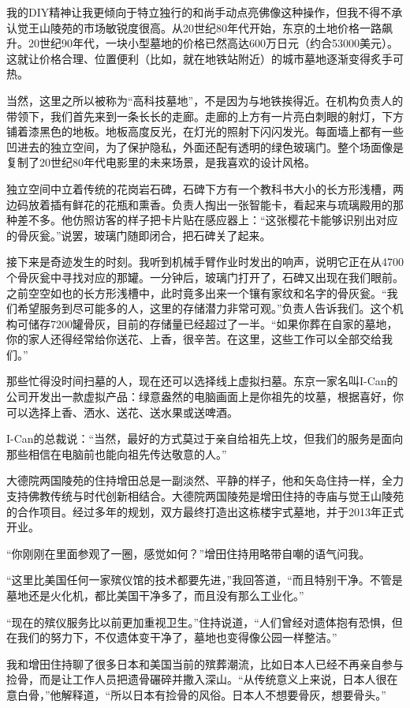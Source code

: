 \documentclass[12pt,oneside]{book}
\begin{document}
\begin{bookref}[frametitle={\cite{好好告别：世界葬礼观察手记}}]
我的DIY精神让我更倾向于特立独行的和尚手动点亮佛像这种操作，但我不得不承认觉王山陵苑的市场敏锐度很高。从20世纪80年代开始，东京的土地价格一路飙升。20世纪90年代，一块小型墓地的价格已然高达600万日元（约合53000美元）。这就让价格合理、位置便利（比如，就在地铁站附近）的城市墓地逐渐变得炙手可热。

当然，这里之所以被称为“高科技墓地”，不是因为与地铁挨得近。在机构负责人的带领下，我们首先来到一条长长的走廊。走廊的上方有一片亮白刺眼的射灯，下方铺着漆黑色的地板。地板高度反光，在灯光的照射下闪闪发光。每面墙上都有一些凹进去的独立空间，为了保护隐私，外面还配有透明的绿色玻璃门。整个场面像是复制了20世纪80年代电影里的未来场景，是我喜欢的设计风格。

独立空间中立着传统的花岗岩石碑，石碑下方有一个教科书大小的长方形浅槽，两边码放着插有鲜花的花瓶和熏香。负责人掏出一张智能卡，看起来与琉璃殿用的那种差不多。他仿照访客的样子把卡片贴在感应器上：“这张樱花卡能够识别出对应的骨灰瓮。”说罢，玻璃门随即闭合，把石碑关了起来。

接下来是奇迹发生的时刻。我听到机械手臂作业时发出的响声，说明它正在从4700个骨灰瓮中寻找对应的那罐。一分钟后，玻璃门打开了，石碑又出现在我们眼前。之前空空如也的长方形浅槽中，此时竟多出来一个镶有家纹和名字的骨灰瓮。“我们希望服务到尽可能多的人，这里的存储潜力非常可观。”负责人告诉我们。这个机构可储存7200罐骨灰，目前的存储量已经超过了一半。“如果你葬在自家的墓地，你的家人还得经常给你送花、上香，很辛苦。在这里，这些工作可以全部交给我们。”

那些忙得没时间扫墓的人，现在还可以选择线上虚拟扫墓。东京一家名叫I-Can的公司开发出一款虚拟产品：绿意盎然的电脑画面上是你祖先的坟墓，根据喜好，你可以选择上香、洒水、送花、送水果或送啤酒。

I-Can的总裁说：“当然，最好的方式莫过于亲自给祖先上坟，但我们的服务是面向那些相信在电脑前也能向祖先传达敬意的人。”

大德院两国陵苑的住持增田总是一副淡然、平静的样子，他和矢岛住持一样，全力支持佛教传统与时代创新相结合。大德院两国陵苑是增田住持的寺庙与觉王山陵苑的合作项目。经过多年的规划，双方最终打造出这栋楼宇式墓地，并于2013年正式开业。

“你刚刚在里面参观了一圈，感觉如何？”增田住持用略带自嘲的语气问我。

“这里比美国任何一家殡仪馆的技术都要先进，”我回答道，“而且特别干净。不管是墓地还是火化机，都比美国干净多了，而且没有那么工业化。”

“现在的殡仪服务比以前更加重视卫生。”住持说道，“人们曾经对遗体抱有恐惧，但在我们的努力下，不仅遗体变干净了，墓地也变得像公园一样整洁。”

我和增田住持聊了很多日本和美国当前的殡葬潮流，比如日本人已经不再亲自参与捡骨，而是让工作人员把遗骨碾碎并撒入深山。“从传统意义上来说，日本人很在意白骨，”他解释道，“所以日本有捡骨的风俗。日本人不想要骨灰，想要骨头。”


\end{bookref}
\end{document}
